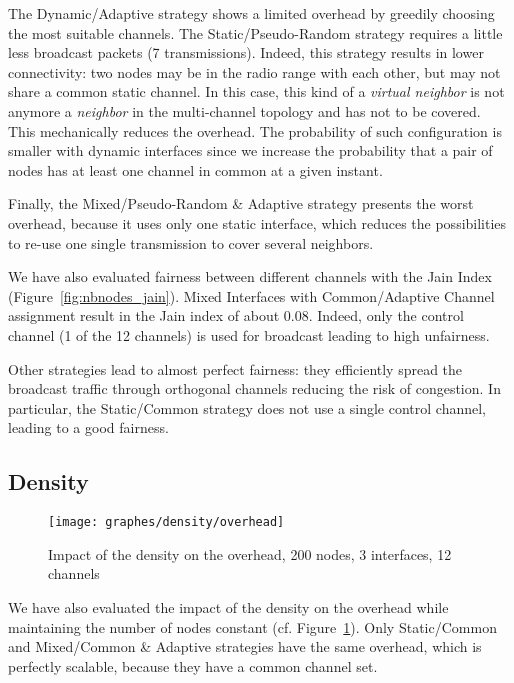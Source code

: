 \documentclass[twoside]{article}
\begin{document}
The Dynamic/Adaptive strategy shows a limited overhead by greedily choosing the most suitable channels.
The Static/Pseudo-Random strategy requires a little less broadcast packets (7 transmissions). 
Indeed, this strategy results in lower connectivity: two nodes may be in the radio range with each other, but may not share a common static channel. 
In this case, this kind of a \emph{virtual neighbor} is not anymore a
\emph{neighbor} in the multi-channel topology and has not to be covered. 
This mechanically reduces the overhead.
The probability of such configuration is smaller with dynamic interfaces since
we increase the probability that a pair of nodes has at least one channel in common at a given instant. 


Finally, the Mixed/Pseudo-Random \& Adaptive strategy presents the worst
overhead, because it uses only one static interface, which reduces the possibilities to re-use one single transmission to cover several neighbors. 


We have also evaluated fairness between different channels with the Jain Index (Figure~\ref{fig:nbnodes_jain}).
Mixed Interfaces with Common/Adaptive Channel assignment result in the Jain index of about 0.08.
Indeed, only the control channel (1 of the 12 channels) is used for broadcast leading to high unfairness.

Other strategies lead to almost perfect fairness: they efficiently spread the broadcast traffic through orthogonal channels reducing the risk of congestion.
In particular, the Static/Common strategy does not use a single control channel, leading to a good fairness.







\subsection{Density}

\begin{figure}[t]
\begin{center}
	\texttt{[image: graphes/density/overhead]}
	\caption{Impact of the density on the overhead, 200 nodes, 3 interfaces, 12 channels}
	\label{fig:density_overhead}
\end{center}
\end{figure}


We have also evaluated the impact of the density on the overhead while
maintaining the number of nodes constant (cf. Figure~\ref{fig:density_overhead}). 
Only Static/Common and Mixed/Common \& Adaptive strategies have the same overhead, which is perfectly
scalable, because they have a common channel set. 
\end{document}
